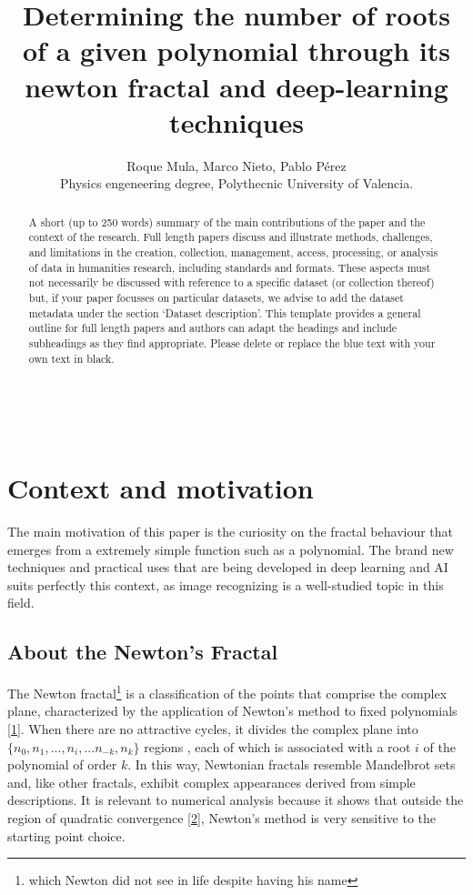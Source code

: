 \documentclass{article}
\title{Determining the number of roots of a given polynomial through its newton fractal and deep-learning techniques}
\author{Roque Mula, Marco Nieto, Pablo Pérez \\
        \small Physics engeneering degree, Polythecnic University of Valencia. \\
}
\date{} %
\begin{document}
\maketitle

\begin{abstract} 
\noindent A short (up to 250 words) summary of the main contributions of the paper and the context of the research. Full length papers discuss and illustrate methods, challenges, and limitations in the creation, collection, management, access, processing, or analysis of data in humanities research, including standards and formats. These aspects must not necessarily be discussed with reference to a specific dataset (or collection thereof) but, if your paper focusses on particular datasets, we advise to add the dataset metadata under the section ‘Dataset description’. This template provides a general outline for full length papers and authors can adapt the headings and include subheadings as they find appropriate. Please delete or replace the blue text with your own text in black.  \end{abstract}

\noindent{}\\


\section{Context and motivation}

The main motivation of this paper is the curiosity on the fractal behaviour that emerges from a extremely simple function such as a polynomial. The brand new techniques and practical uses that are being developed in deep learning and AI suits perfectly this context, as image recognizing is a well-studied topic in this field.

\subsection{About the Newton's Fractal}

\noindent The Newton fractal\footnote{which Newton did not see in life despite having his name} is a classification of the points that comprise the complex plane, characterized by the application of Newton's method to fixed polynomials \hyperref[id1]{[1]}. When there are no attractive cycles, it divides the complex plane into  $\{n_0, n_1, ..., n_i, ... n_{-k}, n_k\}$ regions , each of which is associated with a root $i$ of the polynomial of order $k$. In this way, Newtonian fractals resemble Mandelbrot sets and, like other fractals, exhibit complex appearances derived from simple descriptions. It is relevant to numerical analysis because it shows that outside the region of quadratic convergence \hyperref[id2]{[2]}, Newton's method is very sensitive to the starting point choice.
\end{document}
